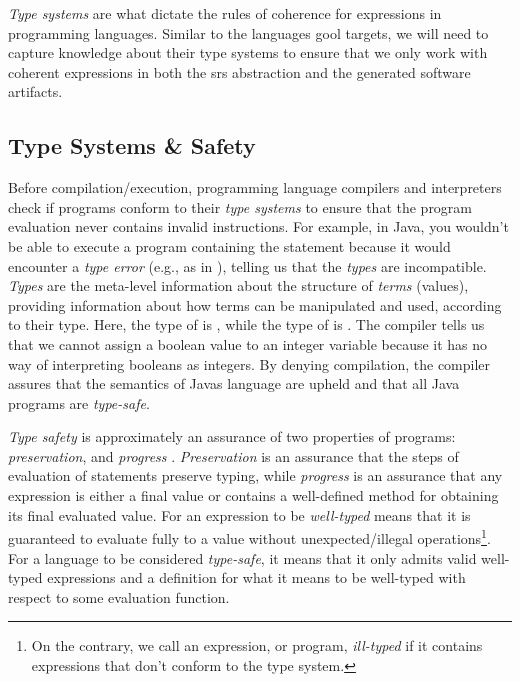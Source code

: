 \textit{Type systems} are what dictate the rules of coherence for expressions in
programming languages. Similar to the languages \acs{gool} targets, we will need
to capture knowledge about their type systems to ensure that we only work with
coherent expressions in both the \acs{srs} abstraction and the generated
software artifacts.

\subsection{Type Systems \& Safety}
\label{chap:typedExpr:sec:coherence:subsec:type-safety}

\pseudoExampleJavaTypeError{}

Before compilation/execution, programming language compilers and interpreters
check if programs conform to their \textit{type systems} to ensure that the
program evaluation never contains invalid instructions. For example, in Java,
you wouldn't be able to execute a program containing the statement
 because it would encounter a \textit{type
error} (e.g., as in ), telling us that the
\textit{types} are incompatible. \textit{Types} are the meta-level information
about the structure of \textit{terms} (values), providing information about how
terms can be manipulated and used, according to their type. Here, the type of
 is , while the type of
 is . The compiler tells us that
we cannot assign a boolean value to an integer variable because it has no way of
interpreting booleans as integers. By denying compilation, the compiler assures
that the semantics of Javas language are upheld and that all Java programs are
\textit{type-safe}.

\textit{Type safety} is approximately an assurance of two properties of
programs: \textit{preservation}, and \textit{progress} \cite{Harper2016}.
\textit{Preservation} is an assurance that the steps of evaluation of statements
preserve typing, while \textit{progress} is an assurance that any expression is
either a final value or contains a well-defined method for obtaining its final
evaluated value. For an expression to be \textit{well-typed} means that it is
guaranteed to evaluate fully to a value without unexpected/illegal
operations\footnote{On the contrary, we call an expression, or program,
\textit{ill-typed} if it contains expressions that don't conform to the type
system.}. For a language to be considered \textit{type-safe}, it means that it
only admits valid well-typed expressions and a definition for what it means to
be well-typed with respect to some evaluation function.

